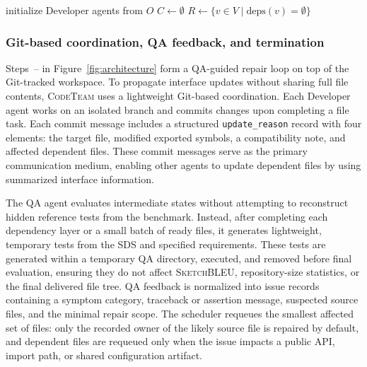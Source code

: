 \documentclass[format=acmsmall, review=false, screen=true]{acmart}
\newcommand{\tool}{\textsc{CodeTeam}\xspace}
\newcommand{\sketchbleu}{\textsc{SketchBLEU}\xspace}
\begin{document}
\begin{algorithm}[t]
\caption{Architect-planned developer allocation with dependency-aware execution in \tool.}
\label{alg:scheduler}
\DontPrintSemicolon
{}
initialize Developer agents from $O$\;
$C \leftarrow \emptyset$ 
$R \leftarrow \{v \in V \mid \text{deps}(v)=\emptyset\}$\;
\end{algorithm}

\subsubsection{Git-based coordination, QA feedback, and termination}
Steps~-- in Figure~\ref{fig:architecture} form a QA-guided repair loop on top of the Git-tracked workspace. To propagate interface updates without sharing full file contents, \tool uses a lightweight Git-based coordination. Each Developer agent works on an isolated branch and commits changes upon completing a file task. Each commit message includes a structured \texttt{update\_reason} record with four elements: the target file, modified exported symbols, a compatibility note, and affected dependent files. These commit messages serve as the primary communication medium, enabling other agents to update dependent files by using summarized interface information.

The QA agent evaluates intermediate states without attempting to reconstruct hidden reference tests from the benchmark. Instead, after completing each dependency layer or a small batch of ready files, it generates lightweight, temporary tests from the SDS and specified requirements. These tests are generated within a temporary QA directory, executed, and removed before final evaluation, ensuring they do not affect \sketchbleu, repository-size statistics, or the final delivered file tree. QA feedback is normalized into issue records containing a symptom category, traceback or assertion message, suspected source files, and the minimal repair scope. The scheduler requeues the smallest affected set of files: only the recorded owner of the likely source file is repaired by default, and dependent files are requeued only when the issue impacts a public API, import path, or shared configuration artifact.
\end{document}
